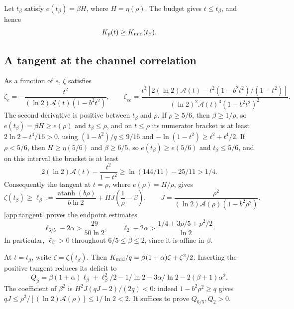 Let $t_\beta$ satisfy $e(t_\beta)=\beta H$, where $H=\eta(\rho)$. The budget gives
$t\le t_\beta$, and hence
\begin{equation}\label{eq:app-boundary}
 K_p(t)\ge K_{\rm mid}(t_\beta).
\end{equation}

\subsection{A tangent at the channel correlation}
As a function of $e$, $\zeta$ satisfies
\[
 \zeta_e=-\frac{t^2}{(\ln2)\mathcal A(t)(1-b^2t^2)},\qquad
 \zeta_{ee}=\frac{t^3[2(\ln2)\mathcal A(t)-t^2(1-b^2t^2)/(1-t^2)]}
 {(\ln2)^2\mathcal A(t)^3(1-b^2t^2)^2}.
\]
The second derivative is positive between $t_\beta$ and $\rho$. If
$\rho\ge5/6$, then $\beta\ge1/\rho$, so $e(t_\beta)=\beta H\ge e(\rho)$ and
$t_\beta\le\rho$, and on $t\le\rho$ its numerator bracket is at least
$2\ln2-t^4/16>0$, using $(1-b^2)/q\le9/16$ and $-\ln(1-t^2)\ge t^2+t^4/2$. If
$\rho<5/6$, then $H\ge\eta(5/6)$ and $\beta\ge6/5$, so $e(t_\beta)\ge e(5/6)$
and $t_\beta\le5/6$, and on this interval the bracket is at least
\[
 2(\ln2)\mathcal A(t)-\frac{t^2}{1-t^2}
 \ge\ln(144/11)-25/11>1/4.
\]
Consequently the tangent at $t=\rho$, where $e(\rho)=H/\rho$, gives
\begin{equation}\label{eq:app-canonicaltangent}
 \zeta(t_\beta)\ge\ell_\beta:=\frac{\operatorname{atanh}(b\rho)}{b\ln2}
 +HJ\left(\frac1\rho-\beta\right),\qquad
 J=\frac{\rho^2}{(\ln2)\mathcal A(\rho)(1-b^2\rho^2)}.
\end{equation}
\autoref{app:tangent} proves the endpoint estimates
\begin{equation}\label{eq:app-zbound}
 \ell_{6/5}-2\alpha>\frac{29}{50\ln2},\qquad
 \ell_2-2\alpha>\frac{1/4+3p/5+p^2/2}{\ln2}.
\end{equation}
In particular, $\ell_\beta>0$ throughout $6/5\le\beta\le2$, since it is affine
in $\beta$.

At $t=t_\beta$, write $\zeta=\zeta(t_\beta)$. Then
$K_{\rm mid}/q=\beta(1+\alpha)\zeta+\zeta^2/2$.
Inserting the positive tangent reduces its deficit to
\[
 Q_\beta=\beta(1+\alpha)\ell_\beta+\ell_\beta^2/2
          -1/\ln2-3\alpha/\ln2-2(\beta+1)\alpha^2.
\]
The coefficient of $\beta^2$ is $H^2J(qJ-2)/(2q)<0$: indeed $1-b^2\rho^2\ge q$
gives $qJ\le\rho^2/[(\ln2)\mathcal A(\rho)]\le1/\ln2<2$. It suffices to prove
$Q_{6/5},Q_2>0$.

